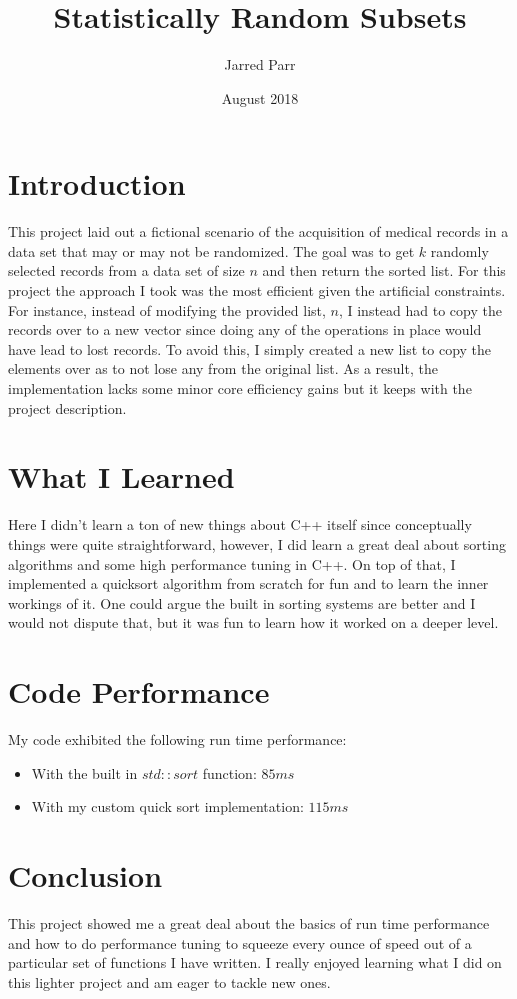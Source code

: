 \documentclass[11pt]{article}
\begin{document}
\title{Statistically Random Subsets}
\author{Jarred Parr}
\date{August 2018}
\maketitle

\section{Introduction}
This project laid out a fictional scenario of the acquisition of medical records in a data set that may or may not be randomized. The goal was to get $k$ randomly selected records from a data set of size $n$ and then return the sorted list. For this project the approach I took was the most efficient given the artificial constraints. For instance, instead of modifying the provided list, $n$, I instead had to copy the records over to a new vector since doing any of the operations in place would have lead to lost records. To avoid this, I simply created a new list to copy the elements over as to not lose any from the original list. As a result, the implementation lacks some minor core efficiency gains but it keeps with the project description.

\section{What I Learned}
Here I didn't learn a ton of new things about C++ itself since conceptually things were quite straightforward, however, I did learn a great deal about sorting algorithms and some high performance tuning in C++. On top of that, I implemented a quicksort algorithm from scratch for fun and to learn the inner workings of it. One could argue the built in sorting systems are better and I would not dispute that, but it was fun to learn how it worked on a deeper level.

\section{Code Performance}
My code exhibited the following run time performance:
\begin{itemize}
\item With the built in $std::sort$ function: $85ms$
\item With my custom quick sort implementation: $115ms$
\end{itemize}

\section{Conclusion}
This project showed me a great deal about the basics of run time performance and how to do performance tuning to squeeze every ounce of speed out of a particular set of functions I have written. I really enjoyed learning what I did on this lighter project and am eager to tackle new ones.
\end{document}
